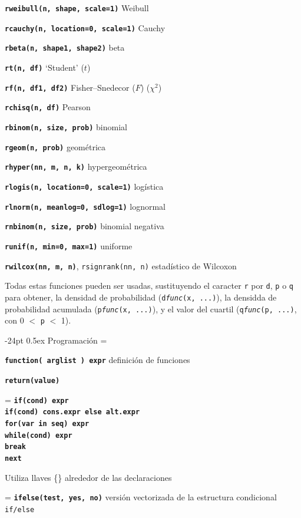 \documentclass[10pt,landscape]{article}
\makeatletter
\renewcommand\section{\@startsection{section}{1}{0mm}%
                                     {-24pt}%
                                     {0.5ex}%
                                {\color[rgb]{1,0.54902,0}\normalfont\large\bfseries}}
\newcommand{\code}{\texttt}
\newcommand{\bcode}[1]{\texttt{\textbf{#1}}}
\makeatother
\begin{document}
\begin{multicols*}{3}
\bcode{rweibull(n, shape, scale=1)} Weibull

\bcode{rcauchy(n, location=0, scale=1)} Cauchy  

\bcode{rbeta(n, shape1, shape2)} beta

\bcode{rt(n, df)} `Student' ($t$)  

\bcode{rf(n, df1, df2)} Fisher--Snedecor ($F$)  ($\chi^2$)  

\bcode{rchisq(n, df)} Pearson 

\bcode{rbinom(n, size, prob)} binomial  

\bcode{rgeom(n, prob)} geométrica  

\bcode{rhyper(nn, m, n, k)} hypergeométrica  

\bcode{rlogis(n, location=0, scale=1)} logística  

\bcode{rlnorm(n, meanlog=0, sdlog=1)} lognormal  

\bcode{rnbinom(n, size, prob)} binomial negativa

\bcode{runif(n, min=0, max=1)} uniforme  

\bcode{rwilcox(nn, m, n)}, \code{rsignrank(nn, n)} estadístico de Wilcoxon  

Todas estas funciones pueden ser usadas, sustituyendo el caracter \code{r} por
\code{d}, \code{p} o \code{q} para obtener, la densidad de probabilidad (\code{d\textsl{func}(x, ...)}), la densidda de probabilidad acumulada (\code{p\textsl{func}(x, ...)}), y el valor del cuartil (\code{q\textsl{func}(p, ...)}, con 0 $<$ \code{p} $<$ 1).


\section{Programación}
\everypar={\hangindent=9mm}

\bcode{function( arglist ) expr} definición de funciones

\bcode{return(value)}

\everypar={\hangindent=0mm}
\bcode{if(cond) expr\\
if(cond) cons.expr  else  alt.expr\\
for(var in seq) expr\\
while(cond) expr\\
break\\
next}

Utiliza llaves \{\} alrededor de las declaraciones


\everypar={\hangindent=9mm}
\bcode{ifelse(test, yes, no)} versión vectorizada de la estructura condicional \code{if/else}



\end{multicols*}
\end{document}
